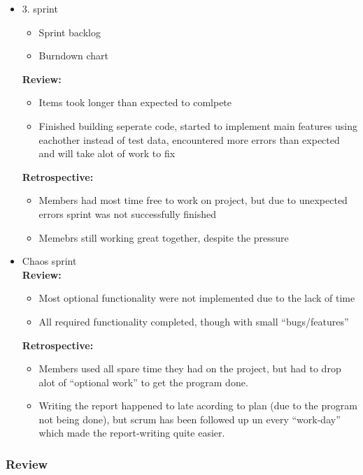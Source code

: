 \documentclass[11pt]{article}
\begin{document}
\begin{itemize}
\item 3. sprint
\label{sec-5-1-4-3}%
\begin{itemize}
\item Sprint backlog
\item Burndown chart
\end{itemize}
     \textbf{Review:}
\begin{itemize}
\item Items took longer than expected to comlpete
\item Finished building seperate code, started to implement main features using eachother
       instead of test data, encountered more errors than expected and will take alot of
       work to fix
\end{itemize}

     \textbf{Retrospective:}
\begin{itemize}
\item Members had most time free to work on project, but due to unexpected errors
       sprint was not successfully finished
\item Memebrs still working great together, despite the pressure
\end{itemize}


\item Chaos sprint\\
\label{sec-5-1-4-4}%
\textbf{Review:}
\begin{itemize}
\item Most optional functionality were not implemented due to the lack of time
\item All required functionality completed, though with small ``bugs/features''
\end{itemize}

     \textbf{Retrospective:}
\begin{itemize}
\item Members used all spare time they had on the project, but had to drop
       alot of ``optional work'' to get the program done.
\item Writing the report happened to late acording to plan (due to the program
       not being done), but scrum has been followed up un every ``work-day''
       which made the report-writing quite easier.
\end{itemize}
\end{itemize} %
\subsubsection{Review}
\label{sec-5-1-5}
\end{document}
